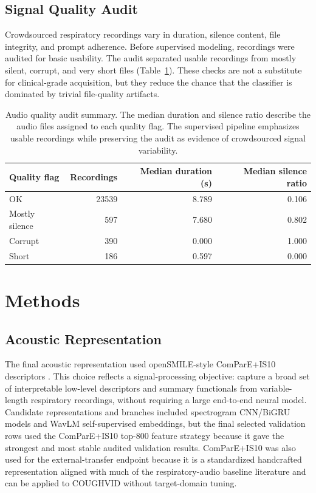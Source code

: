 \documentclass[preprint,12pt]{elsarticle}
\begin{document}
\subsection{Signal Quality Audit}

Crowdsourced respiratory recordings vary in duration, silence content, file integrity, and prompt adherence. Before supervised modeling, recordings were audited for basic usability. The audit separated usable recordings from mostly silent, corrupt, and very short files (Table~\ref{tab:quality}). These checks are not a substitute for clinical-grade acquisition, but they reduce the chance that the classifier is dominated by trivial file-quality artifacts.

\begin{table}[t]
\centering
\caption{Audio quality audit summary. The median duration and silence ratio describe the audio files assigned to each quality flag. The supervised pipeline emphasizes usable recordings while preserving the audit as evidence of crowdsourced signal variability.}
\label{tab:quality}
\begin{tabular}{lrrr}
\toprule
Quality flag & Recordings & Median duration (s) & Median silence ratio \\
\midrule
OK & 23539 & 8.789 & 0.106 \\
Mostly silence & 597 & 7.680 & 0.802 \\
Corrupt & 390 & 0.000 & 1.000 \\
Short & 186 & 0.597 & 0.000 \\
\bottomrule
\end{tabular}
\end{table}

\section{Methods}

\subsection{Acoustic Representation}

The final acoustic representation used openSMILE-style ComParE+IS10 descriptors \citep{eyben2010opensmile}. This choice reflects a signal-processing objective: capture a broad set of interpretable low-level descriptors and summary functionals from variable-length respiratory recordings, without requiring a large end-to-end neural model. Candidate representations and branches included spectrogram CNN/BiGRU models and WavLM self-supervised embeddings, but the final selected validation rows used the ComParE+IS10 top-800 feature strategy because it gave the strongest and most stable audited validation results. ComParE+IS10 was also used for the external-transfer endpoint because it is a standardized handcrafted representation aligned with much of the respiratory-audio baseline literature and can be applied to COUGHVID without target-domain tuning.
\end{document}
